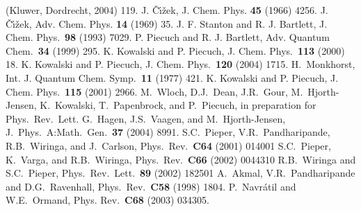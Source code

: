\documentclass{ws-procs9x6}
\begin{document}
\begin{thebibliography}{200}
 (Kluwer, Dordrecht, 2004) 119.
 J. \v{C}\'{\i}\v{z}ek, J. Chem. Phys. {\bf 45} (1966) 4256.
 J. {\v C}{\'\i}{\v z}ek, Adv. Chem. Phys. {\bf 14} (1969) 35. 
 J. F. Stanton and R. J. Bartlett, J. Chem. Phys.~{\bf 98} (1993) 7029.
 P. Piecuch and R. J. Bartlett, Adv. Quantum Chem.~{\bf 34} (1999) 295. 
 K. Kowalski and P. Piecuch, J. Chem. Phys.~{\bf 113} (2000) 18.
 K. Kowalski and P. Piecuch, J. Chem. Phys.~{\bf 120} (2004) 1715.
 H.~Monkhorst, Int. J. Quantum Chem. Symp.~{\bf 11} (1977) 421.
 K. Kowalski and P. Piecuch, J. Chem. Phys.~{\bf 115} (2001) 2966.
 M.~Wloch, D.J.~Dean, J.R.~Gour, M.~Hjorth-Jensen, K.~Kowalski, T.~Papenbrock, and P.~Piecuch, in preparation for Phys.~Rev.~Lett.
 G.~Hagen, J.S.~Vaagen, and M.~Hjorth-Jensen, 
J.~Phys.~A:Math.~Gen.~{\bf 37} (2004) 8991.
 S.C.~Pieper, V.R.~Pandharipande, R.B.~Wiringa, and J.~Carlson, Phys.~Rev.~{\bf C64}
(2001) 014001
 S.C.~Pieper, K.~Varga, and R.B.~Wiringa, Phys.~Rev.~{\bf C66}
(2002) 0044310
  R.B.~Wiringa and S.C.~Pieper, Phys.~Rev.~Lett.~{\bf 89}
(2002) 182501
 A.\ Akmal, V.R.\ Pandharipande and D.G.\
                Ravenhall, Phys.\ Rev.\ {\bf C58}  (1998) 1804.
 P.~Navr\'atil and W.E.~Ormand, Phys. Rev.~{\bf C68} (2003) 034305.

 \end{thebibliography}

 
\end{document}
